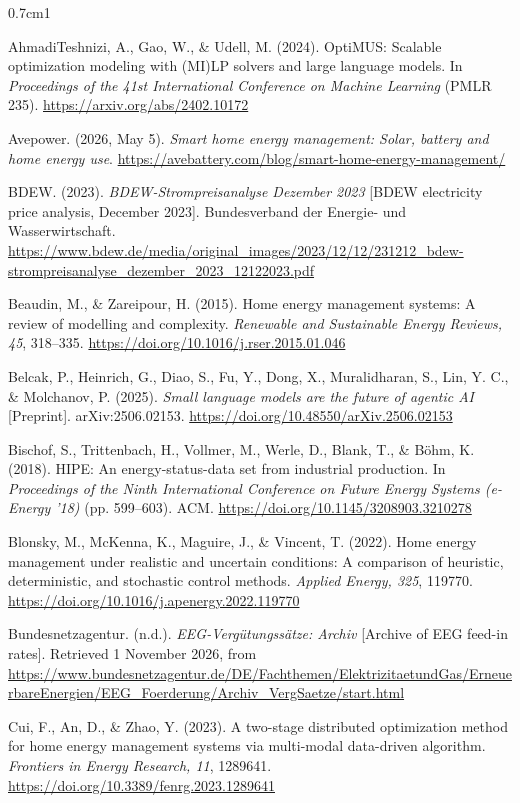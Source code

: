 \documentclass[12pt,a4paper]{report}
\begin{document}
\begin{hangparas}{0.7cm}{1}

AhmadiTeshnizi, A., Gao, W., \& Udell, M. (2024). OptiMUS: Scalable
optimization modeling with (MI)LP solvers and large language models. In
\textit{Proceedings of the 41st International Conference on Machine
Learning} (PMLR 235). \url{https://arxiv.org/abs/2402.10172}

Avepower. (2026, May 5). \textit{Smart home energy management: Solar,
battery and home energy use}.
\url{https://avebattery.com/blog/smart-home-energy-management/}

BDEW. (2023). \textit{BDEW-Strompreisanalyse Dezember 2023}
[BDEW electricity price analysis, December 2023]. Bundesverband der
Energie- und Wasserwirtschaft.
\url{https://www.bdew.de/media/original_images/2023/12/12/231212_bdew-strompreisanalyse_dezember_2023_12122023.pdf}

Beaudin, M., \& Zareipour, H. (2015). Home energy management systems: A
review of modelling and complexity. \textit{Renewable and Sustainable
Energy Reviews, 45}, 318--335.
\url{https://doi.org/10.1016/j.rser.2015.01.046}

Belcak, P., Heinrich, G., Diao, S., Fu, Y., Dong, X., Muralidharan, S.,
Lin, Y. C., \& Molchanov, P. (2025). \textit{Small language models are
the future of agentic AI} [Preprint]. arXiv:2506.02153.
\url{https://doi.org/10.48550/arXiv.2506.02153}

Bischof, S., Trittenbach, H., Vollmer, M., Werle, D., Blank, T., \&
Böhm, K. (2018). HIPE: An energy-status-data set from industrial
production. In \textit{Proceedings of the Ninth International
Conference on Future Energy Systems (e-Energy '18)} (pp. 599--603). ACM.
\url{https://doi.org/10.1145/3208903.3210278}

Blonsky, M., McKenna, K., Maguire, J., \& Vincent, T. (2022). Home
energy management under realistic and uncertain conditions: A comparison
of heuristic, deterministic, and stochastic control methods.
\textit{Applied Energy, 325}, 119770.
\url{https://doi.org/10.1016/j.apenergy.2022.119770}

Bundesnetzagentur. (n.d.). \textit{EEG-Vergütungssätze: Archiv}
[Archive of EEG feed-in rates]. Retrieved 1 November 2026, from
\url{https://www.bundesnetzagentur.de/DE/Fachthemen/ElektrizitaetundGas/ErneuerbareEnergien/EEG_Foerderung/Archiv_VergSaetze/start.html}

Cui, F., An, D., \& Zhao, Y. (2023). A two-stage distributed
optimization method for home energy management systems via multi-modal
data-driven algorithm. \textit{Frontiers in Energy Research, 11},
1289641. \url{https://doi.org/10.3389/fenrg.2023.1289641}


\end{hangparas}
\end{document}
